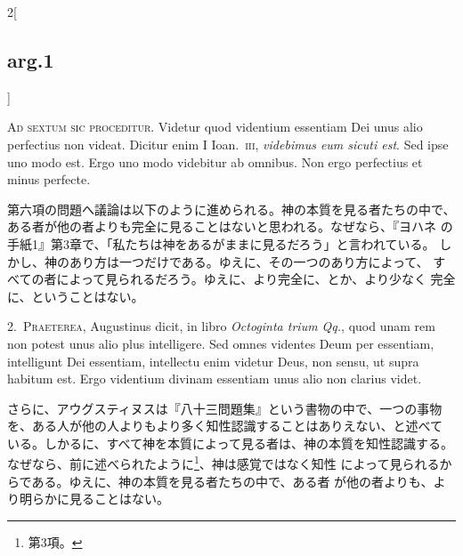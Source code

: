 \documentclass[paper=a4paper,fontsize=10pt,jafontsize=9pt,titlepage]{jlreq}
\begin{document}
{}
\setcounter{section}{6}
\setcounter{subsection}{0}

\begin{paracol}{2}[\subsection{arg.1}]

{\scshape Ad sextum sic proceditur}. Videtur quod videntium essentiam Dei
unus alio perfectius non videat. Dicitur enim I Ioan.\ {\scshape iii}, {\itshape
videbimus eum sicuti est}. Sed ipse uno modo est. Ergo uno modo
videbitur ab omnibus. Non ergo perfectius et minus perfecte.

\switchcolumn

第六項の問題へ議論は以下のように進められる。神の本質を見る者たちの中で、
ある者が他の者よりも完全に見ることはないと思われる。なぜなら、『ヨハネ
の手紙1』第3章で、「私たちは神をあるがままに見るだろう」と言われている。
しかし、神のあり方は一つだけである。ゆえに、その一つのあり方によって、
すべての者によって見られるだろう。ゆえに、より完全に、とか、より少なく
完全に、ということはない。


2.~{\scshape Praeterea}, Augustinus dicit, in libro {\itshape Octoginta trium
Qq.}, quod unam rem non potest unus alio plus intelligere. Sed omnes
videntes Deum per essentiam, intelligunt Dei essentiam, intellectu
enim videtur Deus, non sensu, ut supra habitum est. Ergo videntium
divinam essentiam unus alio non clarius videt.

\switchcolumn

さらに、アウグスティヌスは『八十三問題集』という書物の中で、一つの事物
を、ある人が他の人よりもより多く知性認識することはありえない、と述べて
いる。しかるに、すべて神を本質によって見る者は、神の本質を知性認識する。
なぜなら、前に述べられたように\footnote{第3項。}、神は感覚ではなく知性
によって見られるからである。ゆえに、神の本質を見る者たちの中で、ある者
が他の者よりも、より明らかに見ることはない。



\end{paracol}
\end{document}
